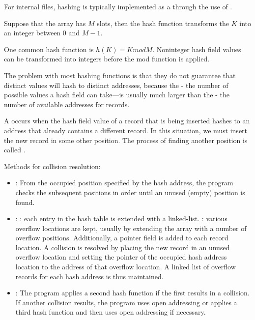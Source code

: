       \par For internal files, hashing is typically implemented as a  through the use of .
      \par Suppose that the array has $M$ slots, then the hash function transforms the  $K$ into an integer between $0$ and $M - 1$.
      \par One common hash function is $h(K) = K mod M$. Noninteger hash field values can be transformed into integers before the mod function is applied.
      \par The problem with most hashing functions is that they do not guarantee that distinct values will hash to distinct addresses, because the  - the number of possible values a hash field can take—is usually much larger than the  - the number of available addresses for records.

      \par A  occurs when the hash field value of a record that is being inserted hashes to an address that already contains a different record. In this situation, we must insert the new record in some other position. The process of finding another position is called .
      \par Methods for collision resolution:
      \begin{itemize}
        \item {}: From the occupied position specified by the hash address, the program checks the subsequent positions in order until an unused (empty) position is found.
        \item {}: : each entry in the hash table is extended with a linked-list. : various overflow locations are kept, usually by extending the array with a number of overflow positions. Additionally, a pointer field is added to each record location. A collision is resolved by placing the new record in an unused overflow location and setting the pointer of the occupied hash address location to the address of that overflow location. A linked list of overflow records for each hash address is thus maintained.
        \item {}: The program applies a second hash function if the first results in a collision. If another collision results, the program uses open addressing or applies a third hash function and then uses open addressing if necessary.
      \end{itemize}

